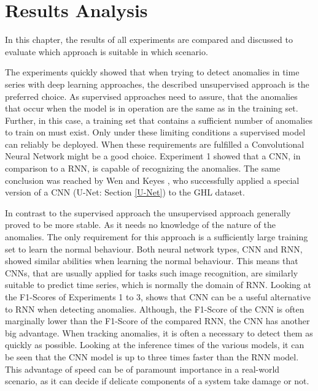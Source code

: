 \chapter{Results Analysis}

In this chapter, the results of all experiments are compared and discussed to evaluate which approach is suitable in which scenario. 

The experiments quickly showed that when trying to detect anomalies in time series with deep learning approaches, the described unsupervised approach is the preferred choice. As supervised approaches need to assure, that the anomalies that occur when the model is in operation are the same as in the training set. Further, in this case, a training set that contains a sufficient number of anomalies to train on must exist. Only under these limiting conditions a supervised model can reliably be deployed. When these requirements are fulfilled a Convolutional Neural Network might be a good choice. 
Experiment 1 showed that a CNN, in comparison to a RNN, is capable of recognizing the anomalies. The same conclusion was reached by Wen and Keyes \parencite*{Wen2019}, who successfully applied a special version of a CNN (U-Net: Section \ref{U-Net}) to the GHL dataset.  

In contrast to the supervised approach the unsupervised approach generally proved to be more stable. As it needs no knowledge of the nature of the anomalies. The only requirement for this approach is a sufficiently large training set to learn the normal behaviour. Both neural network types, CNN and RNN, showed similar abilities when learning the normal behaviour. This means that CNNs, that are usually applied for tasks such image recognition, are similarly suitable to predict time series, which is normally the domain of RNN. Looking at the F1-Scores of Experiments 1 to 3, shows that CNN can be a useful alternative to RNN when detecting anomalies. Although, the F1-Score of the CNN is often marginally lower than the F1-Score of the compared RNN, the CNN has another big advantage. When tracking anomalies, it is often a necessary to detect them as quickly as possible. Looking at the inference times of the various models, it can be seen that the CNN model is up to three times faster than the RNN model. This advantage of speed can be of paramount importance in a real-world scenario, as it can decide if delicate components of a system take damage or not.


